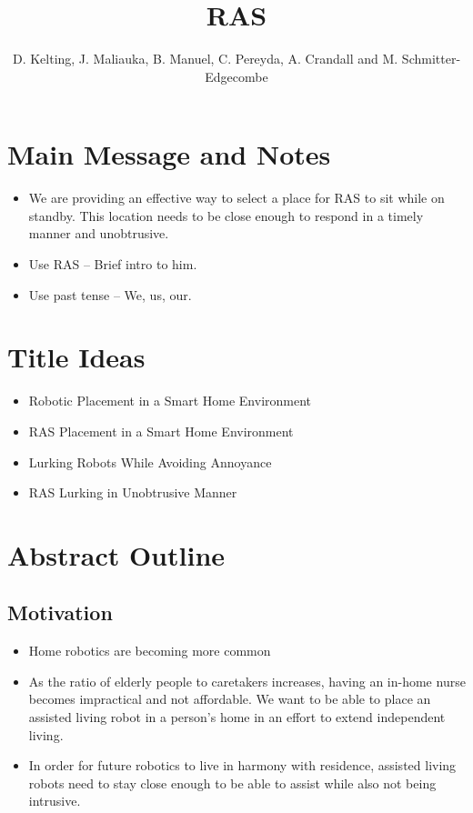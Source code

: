 \documentclass[11pt, conference, a4paper]{IEEEtran}
\author{D. Kelting, J. Maliauka, B. Manuel, C. Pereyda, A. Crandall and M. Schmitter-Edgecombe}
\title{RAS}
\begin{document}
\maketitle

\section{Main Message and Notes}
\begin{itemize}
        \item We are providing an effective way to select a place for RAS to sit while on standby. This location needs to be close enough to respond in a timely manner and unobtrusive.
        \item Use RAS -- Brief intro to him.
        \item Use past tense -- We, us, our.
\end{itemize}


\section{Title Ideas}
\begin{itemize}
        \item Robotic Placement in a Smart Home Environment
        \item RAS Placement in a Smart Home Environment 
        \item Lurking Robots While Avoiding Annoyance
        \item RAS Lurking in Unobtrusive Manner
\end{itemize}


\section{Abstract Outline}


\subsection{Motivation}
\begin{itemize}
    \item Home robotics are becoming more common
    \item As the ratio of elderly people to caretakers increases, having an 
        in-home nurse becomes impractical and not affordable. We want to be able to place an assisted living robot in a person's home in an effort to extend independent living.
    \item In order for future robotics to live in harmony with residence, assisted living robots need to stay close enough to be able to assist while also not being intrusive. 
\end{itemize}
\end{document}
